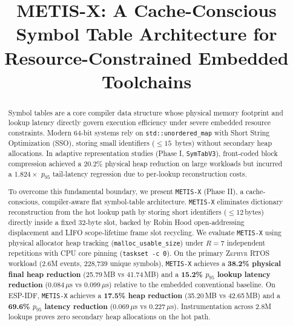 \documentclass[conference]{IEEEtran}
\begin{document}
\title{METIS-X: A Cache-Conscious Symbol Table Architecture for Resource-Constrained Embedded Toolchains}

\author{
\and
{}
\and
{}
}

\maketitle

\begin{abstract}
Symbol tables are a core compiler data structure whose physical memory footprint and lookup latency directly govern execution efficiency under severe embedded resource constraints. Modern 64-bit systems rely on \texttt{std::unordered\_map} with Short String Optimization (SSO), storing small identifiers ($\le 15$~bytes) without secondary heap allocations. In adaptive representation studies (Phase I, \texttt{SymTabV3}), front-coded block compression achieved a 20.2\% physical heap reduction on large workloads but incurred a $1.824\times$ $p_{95}$ tail-latency regression due to per-lookup reconstruction costs.

To overcome this fundamental boundary, we present \texttt{METIS-X} (Phase II), a cache-conscious, compiler-aware flat symbol-table architecture. \texttt{METIS-X} eliminates dictionary reconstruction from the hot lookup path by storing short identifiers ($\le 12$\,bytes) directly inside a fixed 32-byte slot, backed by Robin Hood open-addressing displacement and LIFO scope-lifetime frame slot recycling. We evaluate \texttt{METIS-X} using physical allocator heap tracking (\texttt{malloc\_usable\_size}) under $R=7$ independent repetitions with CPU core pinning (\texttt{taskset -c 0}). On the primary \textsc{Zephyr} RTOS workload (2.6M events, 228,739 unique symbols), \texttt{METIS-X} achieves a \textbf{38.2\% physical final heap reduction} (25.79\,MB vs 41.74\,MB) and a \textbf{15.2\% $p_{95}$ lookup latency reduction} (0.084\,$\mu$s vs 0.099\,$\mu$s) relative to the embedded conventional baseline. On \textsc{ESP-IDF}, \texttt{METIS-X} achieves a \textbf{17.5\% heap reduction} (35.20\,MB vs 42.65\,MB) and a \textbf{69.6\% $p_{95}$ latency reduction} (0.069\,$\mu$s vs 0.227\,$\mu$s). Instrumentation across 2.8M lookups proves zero secondary heap allocations on the hot path.
\end{abstract}
\end{document}
